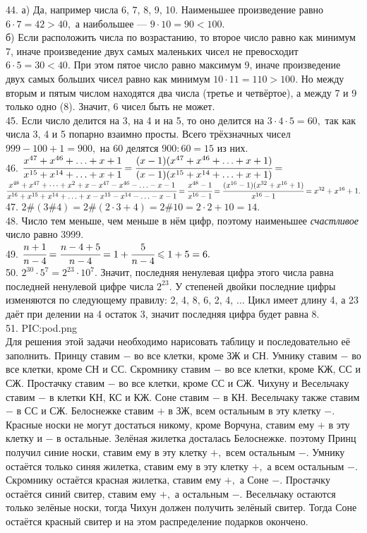 44. а) Да, например числа 6, 7, 8, 9, 10. Наименьшее произведение равно $6\cdot7=42>40,$ а наибольшее --- $9\cdot10=90<100.$\\
б) Если расположить числа по возрастанию, то второе число равно как минимум 7, иначе произведение двух самых маленьких чисел не превосходит $6\cdot5=30<40.$ При этом пятое число равно максимум 9, иначе произведение двух самых больших чисел равно как минимум $10\cdot11=110>100.$ Но между вторым и пятым числом находятся два числа (третье и четвёртое), а между 7 и 9 только одно (8). Значит, 6 чисел быть не может.\\
45. Если число делится на 3, на 4 и на 5, то оно делится на $3\cdot4\cdot5=60,$ так как числа 3, 4 и 5 попарно взаимно просты. Всего трёхзначных чисел $999-100+1=900,$ на 60 делятся $900:60=15$ из них.\\
46. $\cfrac{x^{47}+x^{46}+\ldots+x+1}{x^{15}+x^{14}+\ldots+x+1}=\cfrac{(x-1)(x^{47}+x^{46}+\ldots+x+1)}{(x-1)(x^{15}+x^{14}+\ldots+x+1)}=$\\$
\cfrac{x^{48}+x^{47}+\cdots+x^2+x-x^{47}-x^{46}-\ldots-x-1}{x^{16}+x^{15}+x^{14}+\ldots+x-x^{15}-x^{14}-\ldots-x-1}=\cfrac{x^{48}-1}{x^{16}-1}=
\cfrac{(x^{16}-1)(x^{32}+x^{16}+1)}{x^{16}-1}=x^{32}+x^{16}+1.$\\
47. $2\#(3\#4)=2\#(2\cdot3+4)=2\#10=2\cdot2+10=14.$\\
48. Число тем меньше, чем меньше в нём цифр, поэтому наименьшее {\it счастливое} число равно 3999.\\
49. $\cfrac{n+1}{n-4}=\cfrac{n-4+5}{n-4}=1+\cfrac{5}{n-4}\leqslant1+5=6.$\\
50. $2^{30}\cdot5^7=2^{23}\cdot10^7.$ Значит, последняя ненулевая цифра этого числа равна последней ненулевой цифре числа $2^{23}.$ У степеней двойки последние цифры изменяются по следующему правилу: 2, 4, 8, 6, 2, 4, $\ldots$ Цикл имеет длину 4, а 23 даёт при делении на 4 остаток 3, значит последняя цифра будет равна 8.\\
51.
{{PIC:pod.png}}\\
Для решения этой задачи необходимо нарисовать таблицу и последовательно её заполнить. Принцу ставим $-$ во все клетки, кроме ЗЖ и СН. Умнику ставим $-$ во все клетки, кроме СН и СС. Скромнику ставим $-$ во все клетки, кроме КЖ, СС и СЖ. Простачку ставим $-$ во все клетки, кроме СС и СЖ. Чихуну и Весельчаку ставим $-$ в клетки КН, КС и КЖ. Соне ставим $-$ в КН. Весельчаку также ставим $-$ в СС и СЖ. Белоснежке ставим $+$ в ЗЖ, всем остальным в эту клетку $-$. Красные носки не могут достаться никому, кроме Ворчуна, ставим ему $+$ в эту клетку и $-$ в остальные. Зелёная жилетка досталась Белоснежке. поэтому Принц получил синие носки, ставим ему в эту клетку $+,$ всем остальным $-.$ Умнику остаётся только синяя жилетка, ставим ему в эту клетку $+,$ а всем остальным $-.$ Скромнику остаётся красная жилетка, ставим ему $+,$ а Соне $-.$ Простачку остаётся синий свитер, ставим ему $+,$ а остальным $-.$ Весельчаку остаются только зелёные носки, тогда Чихун должен получить зелёный свитер. Тогда Соне остаётся красный свитер и на этом распределение подарков окончено.\\
